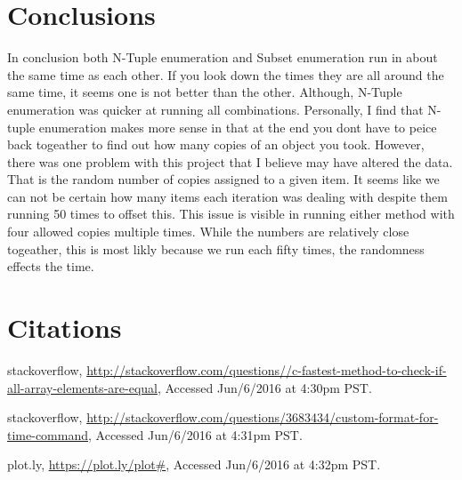 \documentclass[paper=a4, fontsize=11pt]{scrartcl} %
\numberwithin{equation}{section} %
\numberwithin{figure}{section} %
\numberwithin{table}{section} %
\begin{document}
\section{Conclusions}
In conclusion both N-Tuple enumeration and Subset enumeration run in about the same time as each other. If you look down the times they are all around the same time, it seems one is not better than the other. Although, N-Tuple enumeration was quicker at running all combinations. Personally, I find that N-tuple enumeration makes more sense in that at the end you dont have to peice back togeather to find out how many copies of an object you took.
However, there was one problem with this project that I believe may have altered the data. That is the random number of copies assigned to a given item. It seems like we can not be certain how many items each iteration was dealing with despite them running 50 times to offset this. This issue is visible in running either method with four allowed copies multiple times. While the numbers are relatively close togeather, this is most likly because we run each fifty times, the randomness effects the time.
\section{Citations}

\begin{thebibliography}{9}

    stackoverflow,
    \url{http://stackoverflow.com/questions//c-fastest-method-to-check-if-all-array-elements-are-equal},
    Accessed Jun/6/2016 at 4:30pm PST.
  
    stackoverflow,
    \url{http://stackoverflow.com/questions/3683434/custom-format-for-time-command},
    Accessed Jun/6/2016 at 4:31pm PST.
    
    plot.ly,
    \url{https://plot.ly/plot#},
    Accessed Jun/6/2016 at 4:32pm PST.
    
    


\end{thebibliography}
\end{document}
